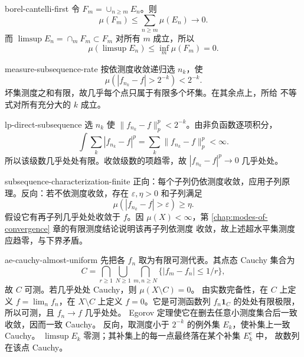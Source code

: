 \begin{solution}{borel-cantelli-first}
令 \(F_m=\cup_{n\ge m}E_n\)。则
\[
 \mu(F_m)\le\sum_{n\ge m}\mu(E_n)\longrightarrow0.
\]
而 \(\limsup E_n=\cap_mF_m\subset F_m\) 对所有 \(m\) 成立，所以
\[
 \mu(\limsup E_n)\le\inf_m\mu(F_m)=0.
\]
\end{solution}

\begin{solution}{measure-subsequence-rate}
按依测度收敛递归选 \(n_k\)，使
\[
 \mu(|f_{n_k}-f|>2^{-k})<2^{-k}.
\]
坏集测度之和有限，故几乎每个点只属于有限多个坏集。在其余点上，所给
不等式对所有充分大的 \(k\) 成立。
\end{solution}

\begin{solution}{lp-direct-subsequence}
选 \(n_k\) 使
\(\|f_{n_k}-f\|_p^p<2^{-k}\)。由非负函数逐项积分，
\[
 \int\sum_k|f_{n_k}-f|^p
 =\sum_k\|f_{n_k}-f\|_p^p<\infty.
\]
所以该级数几乎处处有限。收敛级数的项趋零，故
\(|f_{n_k}-f|^p\to0\) 几乎处处。
\end{solution}

\begin{solution}{subsequence-characterization-finite}
正向：每个子列仍依测度收敛，应用子列原理。反向：若不依测度收敛，存在
\(\varepsilon,\eta>0\) 和子列满足
\[
 \mu(|f_{n_k}-f|>\varepsilon)\ge\eta.
\]
假设它有再子列几乎处处收敛于 \(f\)。因 \(\mu(X)<\infty\)，第
\ref{chap:modes-of-convergence} 章的有限测度结论说明该再子列依测度
收敛，故上述超水平集测度应趋零，与下界矛盾。
\end{solution}

\begin{solution}{ae-cauchy-almost-uniform}
先把各 \(f_n\) 取为有限可测代表。其点态 Cauchy 集合为
\[
 C=\bigcap_{r\ge1}\bigcup_{N\ge1}\bigcap_{m,n\ge N}
   \{|f_m-f_n|\le1/r\},
\]
故 \(C\) 可测。若几乎处处 Cauchy，则 \(\mu(X\setminus C)=0\)。
由实数完备性，在 \(C\) 上定义 \(f=\lim_n f_n\)，在 \(X\setminus C\)
上定义 \(f=0\)。它是可测函数列 \(f_n\mathbf1_C\) 的处处有限极限，
所以可测，且 \(f_n\to f\) 几乎处处。
Egorov 定理使它在删去任意小测度集合后一致收敛，因而一致 Cauchy。
反向，取测度小于 \(2^{-k}\) 的例外集 \(E_k\)，使补集上一致 Cauchy。
\(\limsup E_k\) 零测；其补集上的每一点最终落在某个补集 \(E_k^c\) 中，
故数列在该点 Cauchy。
\end{solution}

